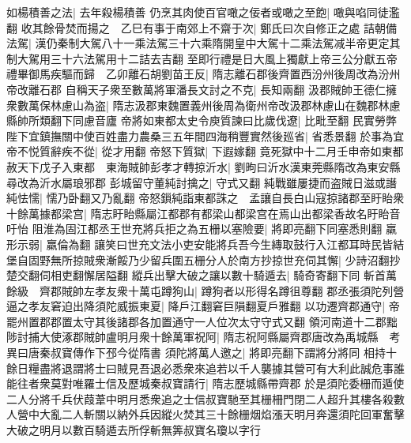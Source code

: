 如楊積善之法|{
	去年殺楊積善}
仍烹其肉使百官噉之佞者或噉之至飽|{
	噉與啗同徒濫翻}
收其餘骨焚而揚之　乙巳有事于南郊上不齋于次|{
	鄭氏曰次自修正之處}
詰朝備法駕|{
	漢仍秦制大駕八十一乘法駕三十六乘隋開皇中大駕十二乘法駕减半帝更定其制大駕用三十六法駕用十二詰去吉翻}
至即行禮是日大風上獨獻上帝三公分獻五帝禮畢御馬疾驅而歸　乙卯離石胡劉苗王反|{
	隋志離石郡後齊置西汾州後周改為汾州帝改離石郡}
自稱天子衆至數萬將軍潘長文討之不克|{
	長知兩翻}
汲郡賊帥王德仁擁衆數萬保林慮山為盗|{
	隋志汲郡東魏置義州後周為衛州帝改汲郡林慮山在魏郡林慮縣帥所類翻下同慮音廬}
帝將如東都太史令庾質諫曰比歲伐遼|{
	比毗至翻}
民實勞弊陛下宜鎮撫關中使百姓盡力農桑三五年間四海稍豐實然後廵省|{
	省悉景翻}
於事為宜帝不悦質辭疾不從|{
	從才用翻}
帝怒下質獄|{
	下遐嫁翻}
竟死獄中十二月壬申帝如東都赦天下戊子入東都　東海賊帥彭孝才轉掠沂水|{
	劉昫曰沂水漢東莞縣隋改為東安縣尋改為沂水屬琅邪郡}
彭城留守董純討擒之|{
	守式又翻}
純戰雖屢捷而盗賊日滋或譖純怯懦|{
	懦乃卧翻又乃亂翻}
帝怒鎻純詣東都誅之　孟讓自長白山寇掠諸郡至盱眙衆十餘萬據都梁宫|{
	隋志盱眙縣屬江都郡有都梁山都梁宫在焉山出都梁香故名盱眙音吁怡}
阻淮為固江都丞王世充將兵拒之為五栅以塞險要|{
	將即亮翻下同塞悉則翻}
羸形示弱|{
	羸倫為翻}
讓笑曰世充文法小吏安能將兵吾今生縳取鼓行入江都耳時民皆結堡自固野無所掠賊衆漸餒乃少留兵圍五栅分人於南方抄掠世充伺其懈|{
	少詩沼翻抄楚交翻伺相吏翻懈居隘翻}
縱兵出擊大破之讓以數十騎遁去|{
	騎奇寄翻下同}
斬首萬餘級　齊郡賊帥左孝友衆十萬屯蹲狗山|{
	蹲狗者以形得名蹲徂尊翻}
郡丞張須陀列營逼之孝友窘迫出降須陀威振東夏|{
	降戶江翻窘巨隕翻夏戶雅翻}
以功遷齊郡通守|{
	帝罷州置郡郡置太守其後諸郡各加置通守一人位次太守守式又翻}
領河南道十二郡黜陟討捕大使涿郡賊帥盧明月衆十餘萬軍祝阿|{
	隋志祝阿縣屬齊郡唐改為禹城縣　考異曰唐秦叔寶傳作下邳今從隋書}
須陀將萬人邀之|{
	將即亮翻下謂將分將同}
相持十餘日糧盡將退謂將士曰賊見吾退必悉衆來追若以千人襲據其營可有大利此誠危事誰能往者衆莫對唯羅士信及歷城秦叔寶請行|{
	隋志歷城縣帶齊郡}
於是須陀委栅而遁使二人分將千兵伏葭葦中明月悉衆追之士信叔寶馳至其栅柵門閉二人超升其樓各殺數人營中大亂二人斬關以納外兵因縱火焚其三十餘栅烟焰漲天明月奔還須陀回軍奮擊大破之明月以數百騎遁去所俘斬無筭叔寶名瓊以字行

